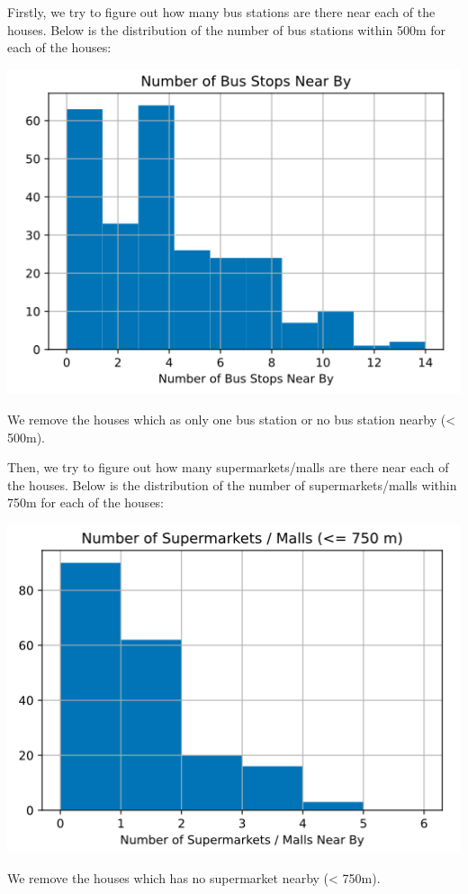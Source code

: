 \documentclass[11pt,notitlepage]{article}
\begin{document}
Firstly, we try to figure out how many bus stations are there near
each of the houses.
Below is the distribution of the number of bus stations
within 500m for each of the houses:
\begin{center}
    \includegraphics[scale=0.4]{bus.png}
\end{center}
We remove the houses which as only one bus station or no bus station
nearby (< 500m).

Then, we try to figure out how many supermarkets/malls are there near
each of the houses.
Below is the distribution of the number of supermarkets/malls
within 750m for each of the houses:
\begin{center}
    \includegraphics[scale=0.4]{mall.png}
\end{center}
We remove the houses which has no supermarket nearby (< 750m).
\end{document}
